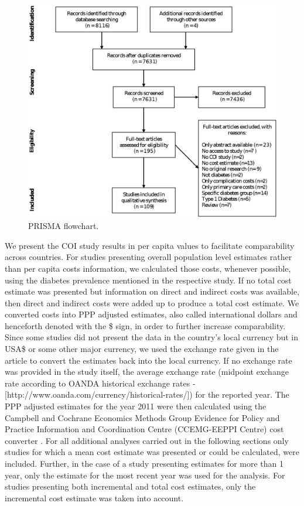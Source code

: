 \documentclass[12pt,english]{article}
\begin{document}
\begin{figure}[hp]
\caption{\label{fig:review_prisma_flowchart}\ac{PRISMA} flowchart.}%
\centering
\includegraphics[width=0.7\linewidth]{Review/Figures/Fig1.eps}
\end{figure}

We present the \ac{COI} study results in per capita values to facilitate comparability across countries. For studies presenting overall population level estimates rather than per capita costs information, we calculated those costs, whenever possible, using the diabetes prevalence mentioned in the respective study. If no total cost estimate was presented but information on direct and indirect costs was available, then direct and indirect costs were added up to produce a total cost estimate. We converted costs into \ac{PPP} adjusted estimates, also called international dollars and henceforth denoted with the \$ sign, in order to further increase comparability. Since some studies did not present the data in the country's local currency but in USA\$ or some other major currency, we used the exchange rate given in the article to convert the estimates back into the local currency. If no exchange rate was provided in the study itself, the average exchange rate (midpoint exchange rate according to OANDA historical exchange rates - [http://www.oanda.com/currency/historical-rates/]) for the reported year. The \ac{PPP} adjusted estimates for the year 2011 were then calculated using the Campbell and Cochrane Economics Methods Group Evidence for Policy and Practice Information and Coordination Centre (CCEMG-EEPPI Centre) cost converter \parencite{Shemilt2010b}. For all additional analyses carried out in the following sections only studies for which a mean cost estimate was presented or could be calculated, were included. Further, in the case of a study presenting estimates for more than 1 year, only the estimate for the most recent year was used for the analysis. For studies presenting both incremental and total cost estimates, only the incremental cost estimate was taken into account.
\end{document}

